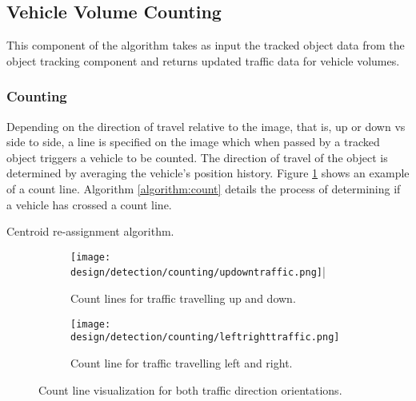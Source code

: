 \subsection{Vehicle Volume Counting}
\label{subsection:count_measure}

This component of the algorithm takes as input the tracked object data from the object tracking component and returns updated traffic data for vehicle volumes. 

\subsubsection{Counting}

Depending on the direction of travel relative to the image, that is, up or down vs side to side, a line is specified on the image which when passed by a tracked object triggers a vehicle to be counted. The direction of travel of the object is determined by averaging the vehicle's position history. Figure \ref{fig:count_lines} shows an example of a count line. Algorithm \ref{algorithm:count} details the process of determining if a vehicle has crossed a count line.

\begin{algorithm}
	\SetAlgoLined
	\caption{Centroid re-assignment algorithm. \cite{adrian_rosebrock_vehicle_tracking}}
	\label{algorithm:count}
  \end{algorithm}

\begin{figure}[H]
	\centering
	\begin{subfigure}[b]{0.42\textwidth}
            \centering\texttt{[image: design/detection/counting/updowntraffic.png]}|
            \captionsetup{format = hang}  
      		\caption{Count lines for traffic travelling up and down.}
    	\end{subfigure}
    	\begin{subfigure}[b]{0.42\textwidth}
      		\centering\texttt{[image: design/detection/counting/leftrighttraffic.png]}
            \captionsetup{format = hang}    
            \caption{Count line for traffic travelling left and right.}
        \end{subfigure}
        \captionsetup{format = hang}
    	\caption{Count line visualization for both traffic direction orientations.}
    	\label{fig:count_lines}
\end{figure}

